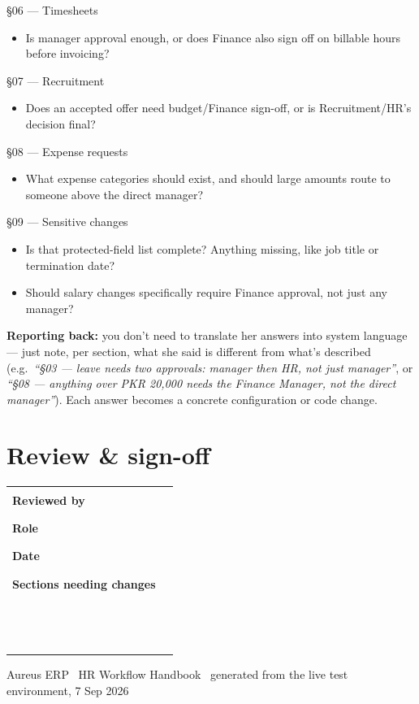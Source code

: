 \documentclass[11pt,a4paper]{article}
\newcommand{\qitem}{\item[$\square$]}
\begin{document}
\begin{questionsbox}{\S06 --- Timesheets}
\begin{itemize}[leftmargin=1.6em]
  \qitem Is manager approval enough, or does Finance also sign off on billable hours before invoicing?
\end{itemize}
\end{questionsbox}

\begin{questionsbox}{\S07 --- Recruitment}
\begin{itemize}[leftmargin=1.6em]
  \qitem Does an accepted offer need budget/Finance sign-off, or is Recruitment/HR's decision final?
\end{itemize}
\end{questionsbox}

\begin{questionsbox}{\S08 --- Expense requests}
\begin{itemize}[leftmargin=1.6em]
  \qitem What expense categories should exist, and should large amounts route to someone above the direct manager?
\end{itemize}
\end{questionsbox}

\begin{questionsbox}{\S09 --- Sensitive changes}
\begin{itemize}[leftmargin=1.6em]
  \qitem Is that protected-field list complete? Anything missing, like job title or termination date?
  \qitem Should salary changes specifically require Finance approval, not just any manager?
\end{itemize}
\end{questionsbox}

\vspace{1.5em}
\noindent\textbf{Reporting back:} you don't need to translate her answers into system language --- just note, per section, what she said is different from what's described (e.g.\ \emph{``\S03 --- leave needs two approvals: manager then HR, not just manager''}, or \emph{``\S08 --- anything over PKR 20{,}000 needs the Finance Manager, not the direct manager''}). Each answer becomes a concrete configuration or code change.

\newpage
\section*{Review \& sign-off}

\noindent
\begin{tabular}{@{}p{3.4cm}p{10cm}@{}}
\textbf{Reviewed by} & \rule{9cm}{0.4pt} \\[1.6em]
\textbf{Role} & \rule{9cm}{0.4pt} \\[1.6em]
\textbf{Date} & \rule{9cm}{0.4pt} \\[1.6em]
\textbf{Sections needing changes} & \rule{9cm}{0.4pt} \\[1.6em]
 & \rule{9cm}{0.4pt} \\[1.6em]
 & \rule{9cm}{0.4pt} \\
\end{tabular}

\vspace{2em}
\begin{center}
\small\color{inksoft}
Aureus ERP \textperiodcentered\ HR Workflow Handbook \textperiodcentered\ generated from the live test environment, 7 Sep 2026
\end{center}
\end{document}
